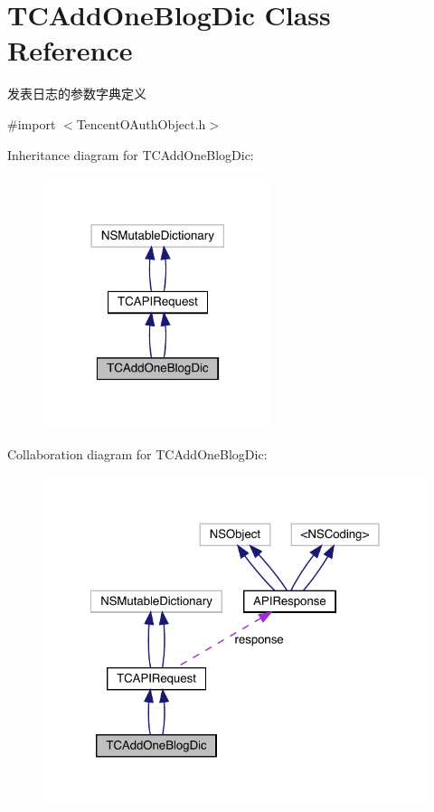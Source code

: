 \hypertarget{interface_t_c_add_one_blog_dic}{}\section{T\+C\+Add\+One\+Blog\+Dic Class Reference}
\label{interface_t_c_add_one_blog_dic}


发表日志的参数字典定义  




{\ttfamily \#import $<$Tencent\+O\+Auth\+Object.\+h$>$}



Inheritance diagram for T\+C\+Add\+One\+Blog\+Dic\+:\nopagebreak
\begin{figure}[H]
\begin{center}
\leavevmode
\includegraphics[width=190pt]{interface_t_c_add_one_blog_dic__inherit__graph}
\end{center}
\end{figure}


Collaboration diagram for T\+C\+Add\+One\+Blog\+Dic\+:\nopagebreak
\begin{figure}[H]
\begin{center}
\leavevmode
\includegraphics[width=322pt]{interface_t_c_add_one_blog_dic__coll__graph}
\end{center}
\end{figure}
